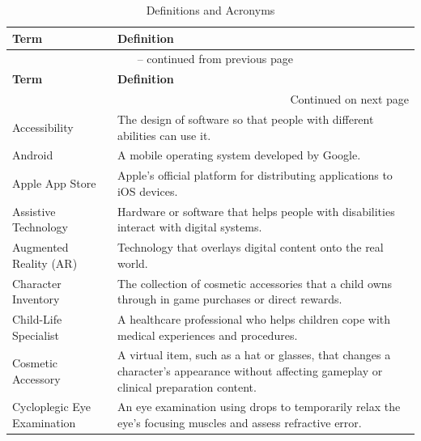 \documentclass[12pt]{article}
\begin{document}
\begin{longtable}{@{}p{} p{}@{}}
\caption{Definitions and Acronyms}
\label{tab:DefinitionsAndAcronyms}\\

\toprule
\textbf{Term} & \textbf{Definition} \\
\midrule
\endfirsthead

\multicolumn{2}{c}{\tablename\ \thetable{} -- continued from previous page} \\
\toprule
\textbf{Term} & \textbf{Definition} \\
\midrule
\endhead

\midrule
\multicolumn{2}{r}{Continued on next page} \\
\endfoot

\bottomrule
\endlastfoot

Accessibility &
The design of software so that people with different abilities can use it. \\

Android &
A mobile operating system developed by Google. \\

Apple App Store &
Apple's official platform for distributing applications to iOS devices. \\

Assistive Technology &
Hardware or software that helps people with disabilities interact with digital systems. \\

Augmented Reality (AR) &
Technology that overlays digital content onto the real world. \\

Character Inventory &
The collection of cosmetic accessories that a child owns through in game purchases or direct rewards. \\

Child-Life Specialist &
A healthcare professional who helps children cope with medical experiences and procedures. \\

Cosmetic Accessory &
A virtual item, such as a hat or glasses, that changes a character's appearance without affecting gameplay or clinical preparation content. \\

Cycloplegic Eye Examination &
An eye examination using drops to temporarily relax the eye's focusing muscles and assess refractive error. \\


\end{longtable}
\end{document}
